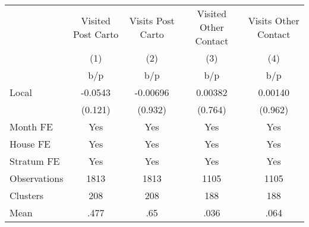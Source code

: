 {
\def\sym#1{\ifmmode^{#1}\else\(^{#1}\)\fi}
\begin{tabular}{l*{4}{c}}
\toprule
                &\multicolumn{1}{c}{Visited Post Carto}&\multicolumn{1}{c}{Visits Post Carto}&\multicolumn{1}{c}{Visited Other Contact}&\multicolumn{1}{c}{Visits Other Contact}\\
                &\multicolumn{1}{c}{(1)}&\multicolumn{1}{c}{(2)}&\multicolumn{1}{c}{(3)}&\multicolumn{1}{c}{(4)}\\
                &      b/p&      b/p&      b/p&      b/p\\
\midrule
Local           &  -0.0543& -0.00696&  0.00382&  0.00140\\
                &  (0.121)&  (0.932)&  (0.764)&  (0.962)\\
Month FE        &      Yes&      Yes&      Yes&      Yes\\
House FE        &      Yes&      Yes&      Yes&      Yes\\
Stratum FE      &      Yes&      Yes&      Yes&      Yes\\
\midrule
Observations    &     1813&     1813&     1105&     1105\\
Clusters        &      208&      208&      188&      188\\
Mean            &     .477&      .65&     .036&     .064\\
\bottomrule
\end{tabular}
}
